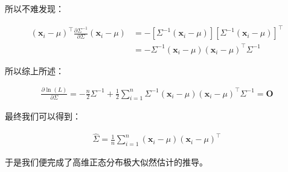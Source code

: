 \documentclass[UTF8]{book}
\begin{document}
所以不难发现：
\begin{large}
    \begin{equation}
        \begin{aligned}
            (\mathbf{x}_i-\mu)^\top\frac{\partial \Sigma^{-1}}{\partial \Sigma}(\mathbf{x}_i-\mu) &= -\left[ \Sigma^{-1}(\mathbf{x}_i-\mu) \right] \left[ \Sigma^{-1}(\mathbf{x}_i-\mu) \right]^\top \\
            &= -\Sigma^{-1}(\mathbf{x}_i-\mu)(\mathbf{x}_i-\mu)^\top \Sigma^{-1}
            \nonumber
        \end{aligned}
    \end{equation}
\end{large}
所以综上所述：
\begin{large}
    \begin{equation}
        \begin{aligned}
            \frac{\partial \ln (L)}{\partial \Sigma} = -\frac{n}{2}\Sigma^{-1} + \frac{1}{2}\sum_{i=1}^{n} \Sigma^{-1}(\mathbf{x}_i-\mu)(\mathbf{x}_i-\mu)^\top\Sigma^{-1}=\mathbf{O}
            \nonumber
        \end{aligned}
    \end{equation}
\end{large}
最终我们可以得到：
\begin{large}
    \begin{equation}
        \begin{aligned}
            \hat{\Sigma}=\frac{1}{n}\sum_{i=1}^{n}(\mathbf{x}_i-\mu)(\mathbf{x}_i-\mu)^\top
            \nonumber
        \end{aligned}
    \end{equation}
\end{large}
于是我们便完成了高维正态分布极大似然估计的推导。
\end{document}
